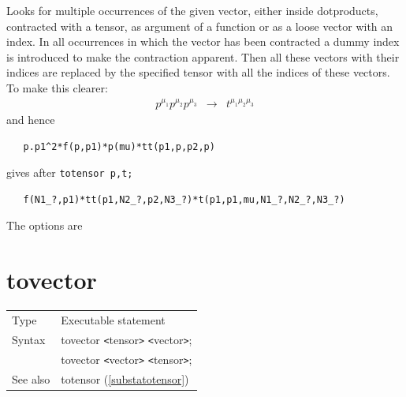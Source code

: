 \noindent Looks for multiple occurrences of the given 
vector, either inside dotproducts, contracted with a tensor, as argument of 
a function or as a loose vector with an index. In all occurrences in 
which the vector has been contracted a dummy index is introduced to make 
the contraction apparent. Then all these vectors with their indices are 
replaced by the specified tensor with all the indices of these vectors. To 
make this clearer:
\begin{eqnarray}
    p^{\mu_1}p^{\mu_2}p^{\mu_3} & \rightarrow & t^{\mu_1\mu_2\mu_3} \nonumber
\end{eqnarray}
and hence
\begin{verbatim}
   p.p1^2*f(p,p1)*p(mu)*tt(p1,p,p2,p)
\end{verbatim}
gives after \verb:totensor p,t;:
\begin{verbatim}
   f(N1_?,p1)*tt(p1,N2_?,p2,N3_?)*t(p1,p1,mu,N1_?,N2_?,N3_?)
\end{verbatim}\vspace{4mm}

\noindent The options are




\vspace{10mm}


\section{tovector}
\label{substatovector}

\noindent \begin{tabular}{ll}
Type & Executable statement\\
Syntax & tovector {\tt<}tensor{\tt>} {\tt<}vector{\tt>}; \\
       & tovector {\tt<}vector{\tt>} {\tt<}tensor{\tt>};
\\ See also & totensor (\ref{substatotensor})
\end{tabular} \vspace{4mm}


